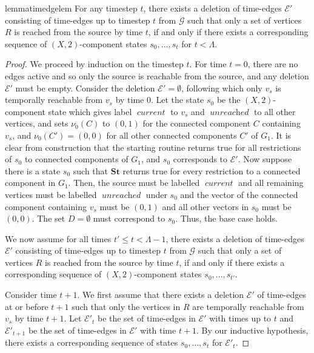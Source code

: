 \documentclass[a4paper,UKenglish,cleveref, autoref, thm-restate]{lipics-v2021} %
\DeclareMathOperator{\unreached}{\textit{unreached}}
\DeclareMathOperator{\current}{\textit{current}}
\begin{document}
\begin{toappendix}
\begin{restatable}{lemma}{timedgelem}\label{lem:temp-edge-tim}
    For any timestep $t$, there exists a deletion of time-edges $\mathcal{E}'$ consisting of time-edges up to timestep $t$ from $\mathcal{G}$ such that only a set of vertices $R$ is reached from the source by time $t$, if and only if there exists a corresponding sequence of $(X,2)$-component states $s_0, \ldots, s_t$ for $t<\Lambda$.
\end{restatable}
\begin{proof}
    We proceed by induction on the timestep $t$. For time $t=0$, there are no edges active and so only the source is reachable from the source, and any deletion $\mathcal{E}'$ must be empty. Consider the deletion $\mathcal{E}'=\emptyset$, following which only $v_s$ is temporally reachable from $v_s$ by time 0. Let the state $s_0$ be the $(X,2)$-component state which gives label $\current$ to $v_s$ and $\unreached$ to all other vertices, and sets $\nu_0(C)$ to $(0,1)$ for the connected component $C$ containing $v_s$, and $\nu_0(C')=(0,0)$ for all other connected components $C'$ of $G_1$. It is clear from construction that the starting routine returns true for all restrictions of $s_0$ to connected components of $G_1$, and $s_0$ corresponds to $\mathcal{E}'$. Now suppose there is a state $s_0$ such that $\textbf{St}$ returns true for every restriction to a connected component in $G_1$. Then, the source must be labelled $\current$ and all remaining vertices must be labelled $\unreached$ under $s_0$ and the vector of the connected component containing $v_s$ must be $(0,1)$ and all other vectors in $s_0$ must be $(0,0)$. The set $D=\emptyset$ must correspond to $s_0$. Thus, the base case holds.

    We now assume for all times $t'\leq t<\Lambda-1$, there exists a deletion of time-edges $\mathcal{E}'$ consisting of time-edges up to timestep $t$ from $\mathcal{G}$ such that only a set of vertices $R$ is reached from the source by time $t$, if and only if there exists a corresponding sequence of $(X,2)$-component states $s_0, \ldots, s_{t'}$.

    Consider time $t+1$. We first assume that there exists a deletion $\mathcal{E}'$ of time-edges at or before $t+1$ such that only the vertices in $R$ are temporally reachable from $v_s$ by time $t+1$. Let $\mathcal{E}'_{t}$ be the set of time-edges in $\mathcal{E}'$ with times up to $t$ and $\mathcal{E}'_{t+1}$ be the set of time-edges in $\mathcal{E}'$ with time $t+1$. By our inductive hypothesis, there exists a corresponding sequence of states $s_0,\ldots,s_t$ for $\mathcal{E}'_t$.
    

\end{proof}
\end{toappendix}
\end{document}
